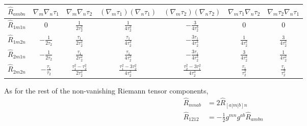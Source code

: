 \medskip
\renewcommand{\arraystretch}{1.8}
\begin{tabular}{c|cccccc}
\toprule
$\widehat{R}_{ambn}$ 
  & $\nabla_m\nabla_n\tau_1$ 
  & $\nabla_m\nabla_n\tau_2$ 
  & $(\nabla_m\tau_1)(\nabla_n\tau_1)$ 
  & $(\nabla_m\tau_2)(\nabla_n\tau_2)$ 
  & $\nabla_m\tau_1\nabla_n\tau_2$ 
  & $\nabla_m\tau_2\nabla_n\tau_1$ \\
\midrule
$\widehat{R}_{1m1n}$ & $0$ & $\frac{1}{2\tau_2^2}$ & $\frac{1}{4\tau_2^3}$ & $-\frac{3}{4\tau_2^3}$ & $0$ & $0$ \\
$\widehat{R}_{1m2n}$ & $-\frac{1}{2\tau_2}$ & $\frac{\tau_1}{2\tau_2^2}$ & $\frac{\tau_1}{4\tau_2^3}$ & $-\frac{3\tau_1}{4\tau_2^3}$ & $\frac{1}{4\tau_2^2}$ & $\frac{3}{4\tau_2^2}$ \\
$\widehat{R}_{2m1n}$ & $-\frac{1}{2\tau_2}$ & $\frac{\tau_1}{2\tau_2^2}$ & $\frac{\tau_1}{4\tau_2^3}$ & $-\frac{3\tau_1}{4\tau_2^3}$ & $\frac{3}{4\tau_2^2}$ & $\frac{1}{4\tau_2^2}$ \\

$\widehat{R}_{2m2n}$ & $-\frac{\tau_1}{\tau_2}$ & $\frac{\tau_1^2-\tau_2^2}{2\tau_2^2}$ & $\frac{\tau_1^2-3\tau_2^2}{4\tau_2^3}$ & $\frac{\tau_2^2-3\tau_1^2}{4\tau_2^3}$ & $\frac{\tau_1}{\tau_2^2}$ & $\frac{\tau_1}{\tau_2^2}$ \\
\bottomrule
\end{tabular}
\medskip

As for the rest of the non-vanishing Riemann tensor components,
\begin{equation}
\begin{aligned}
\widehat{R}_{mnab} 
&= 2\widehat{R}_{[a|m|b]n}\\
\widehat{R}_{1212}
&= -\frac{1}{2}g^{mn}g^{ab} \widehat{R}_{ambn} 
\end{aligned}
\end{equation}

